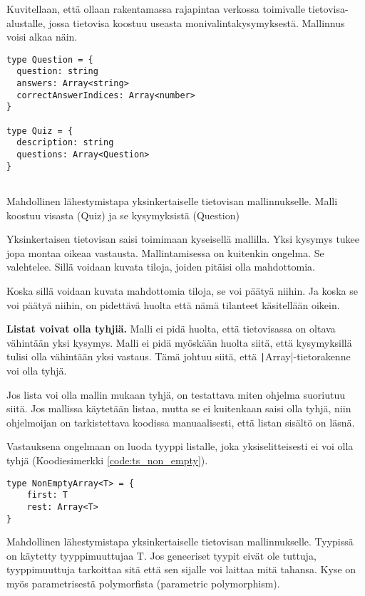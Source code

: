 Kuvitellaan, että ollaan rakentamassa rajapintaa verkossa toimivalle tietovisa-alustalle, jossa tietovisa koostuu useasta monivalintakysymyksestä. Mallinnus voisi alkaa näin.

\begin{code}
    \begin{verbatim}
type Question = {
  question: string
  answers: Array<string>
  correctAnswerIndices: Array<number>
}

type Quiz = {
  description: string
  questions: Array<Question>
}
         
\end{verbatim}
    \caption{Mahdollinen lähestymistapa yksinkertaiselle tietovisan mallinnukselle. Malli koostuu visasta (Quiz) ja se kysymyksistä (Question)}
    \label{code:ts_first_quiz}
\end{code}

Yksinkertaisen tietovisan saisi toimimaan kyseisellä mallilla. Yksi kysymys tukee jopa montaa oikeaa vastausta.
Mallintamisessa on kuitenkin ongelma. Se valehtelee. Sillä voidaan kuvata tiloja, joiden pitäisi olla mahdottomia.

Koska sillä voidaan kuvata mahdottomia tiloja, se voi päätyä niihin. Ja koska se voi päätyä niihin, on pidettävä huolta että nämä tilanteet käsitellään oikein.

\textbf{Listat voivat olla tyhjiä.} Malli ei pidä huolta, että tietovisassa on oltava vähintään yksi kysymys. Malli ei pidä myöskään huolta siitä, että kysymyksillä tulisi olla vähintään yksi vastaus. Tämä johtuu siitä, että \texttt|Array|-tietorakenne voi olla tyhjä.

Jos lista voi olla mallin mukaan tyhjä, on testattava miten ohjelma suoriutuu siitä. Jos mallissa käytetään listaa, mutta se ei kuitenkaan saisi olla tyhjä, niin ohjelmoijan on tarkistettava koodissa manuaalisesti, että listan sisältö on läsnä.

Vastauksena ongelmaan on luoda tyyppi listalle, joka yksiselitteisesti ei voi olla tyhjä (Koodiesimerkki \ref{code:ts_non_empty}).

\begin{code}
    \begin{verbatim}
type NonEmptyArray<T> = {
    first: T
    rest: Array<T>
}
    \end{verbatim}
    \caption{Mahdollinen lähestymistapa yksinkertaiselle tietovisan mallinnukselle. Tyypissä on käytetty tyyppimuuttujaa T. Jos geneeriset tyypit eivät ole tuttuja, tyyppimuuttuja tarkoittaa sitä että sen sijalle voi laittaa mitä tahansa. Kyse on myös parametrisestä polymorfista (parametric polymorphism).}
    \label{code:ts_non_empty}
\end{code}

